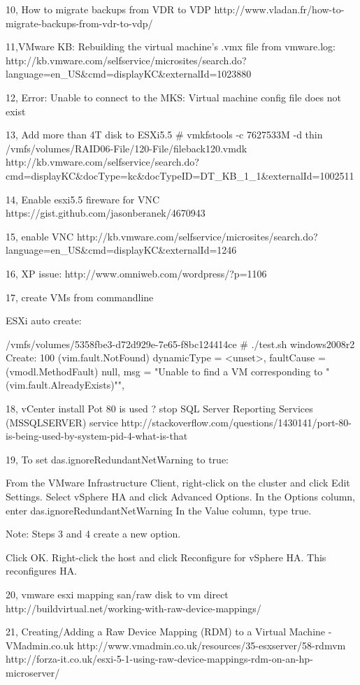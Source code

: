 10, How to migrate backups from VDR to VDP
http://www.vladan.fr/how-to-migrate-backups-from-vdr-to-vdp/


11,VMware KB: Rebuilding the virtual machine's .vmx file from vmware.log:
http://kb.vmware.com/selfservice/microsites/search.do?language=en_US&cmd=displayKC&externalId=1023880

12, Error: Unable to connect to the MKS: Virtual machine config file does not exist

13, Add more than 4T disk to ESXi5.5
# vmkfstools -c 7627533M -d thin /vmfs/volumes/RAID06-File/120-File/fileback120.vmdk
http://kb.vmware.com/selfservice/search.do?cmd=displayKC&docType=kc&docTypeID=DT_KB_1_1&externalId=1002511

14, Enable esxi5.5 fireware for VNC
https://gist.github.com/jasonberanek/4670943

15, enable VNC
http://kb.vmware.com/selfservice/microsites/search.do?language=en_US&cmd=displayKC&externalId=1246


16, XP issue:
http://www.omniweb.com/wordpress/?p=1106



17, create VMs from commandline


ESXi auto create:

/vmfs/volumes/5358fbe3-d72d929e-7e65-f8bc124414ce # ./test.sh windows2008r2
Create: 100%
(vim.fault.NotFound) {
   dynamicType = <unset>, 
   faultCause = (vmodl.MethodFault) null, 
   msg = "Unable to find a VM corresponding to "(vim.fault.AlreadyExists)"", 
}

18, vCenter install Pot 80 is used ?
stop SQL Server Reporting Services (MSSQLSERVER) service
http://stackoverflow.com/questions/1430141/port-80-is-being-used-by-system-pid-4-what-is-that

19, To set das.ignoreRedundantNetWarning to true:

    From the VMware Infrastructure Client, right-click on the cluster and click Edit Settings.
    Select vSphere HA and click Advanced Options.
    In the Options column, enter das.ignoreRedundantNetWarning
    In the Value column, type true.

Note: Steps 3 and 4 create a new option.

Click OK.
Right-click the host and click Reconfigure for vSphere HA. This reconfigures HA.

20, vmware esxi mapping san/raw disk to vm direct
http://buildvirtual.net/working-with-raw-device-mappings/

21, Creating/Adding a Raw Device Mapping (RDM) to a Virtual Machine - VMadmin.co.uk
http://www.vmadmin.co.uk/resources/35-esxserver/58-rdmvm
http://forza-it.co.uk/esxi-5-1-using-raw-device-mappings-rdm-on-an-hp-microserver/
